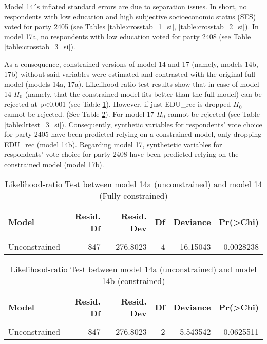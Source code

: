 \documentclass[
]{article}
\begin{document}
Model 14´s inflated standard errors are due to separation issues. In short, no respondents with
low education and high subjective socioeconomic status (SES) voted for party 2405 (see Tables \ref{table:crosstab_1_si},
\ref{table:crosstab_2_si}). In model 17a, no respondents with low education voted for party 2408
(see Table \ref{table:crosstab_3_si}).

As a consequence, constrained versions of model 14 and 17 (namely, models 14b, 17b) without said variables were
estimated and contrasted with the original full model (models 14a, 17a). Likelihood-ratio test results show
that in case of model 14 \(H_0\) (namely, that the constrained model fits better than the full model) can be rejected
at p\textless0.001 (see Table \ref{table:lrtest_1_si}). However, if just EDU\_rec is dropped \(H_0\) cannot be rejected.
(See Table \ref{table:lrtest_2_si}). For model 17 \(H_0\) cannot be rejected (see Table \ref{table:lrtest_3_si}).
Consequently, synthetic variables for respondents' vote choice for party 2405 have been
predicted relying on a constrained model, only dropping EDU\_rec (model 14b). Regarding model 17, synthetetic variables for respondents' vote choice for party 2408 have been predicted relying on the constrained model (model 17b).

\begin{table}[!h]

\caption{\label{tab:unnamed-chunk-164}Likelihood-ratio Test between model 14a (unconstrained) and model 14 (Fully constrained)
                  \label{table:lrtest_1_si}}
\centering
\begin{tabular}[t]{l|r|r|r|r|r}
\hline
Model & Resid. Df & Resid. Dev & Df & Deviance & Pr(>Chi)\\
\hline
\cellcolor{gray!6}{Constrained} & \cellcolor{gray!6}{851} & \cellcolor{gray!6}{292.9527} & \cellcolor{gray!6}{} & \cellcolor{gray!6}{} & \cellcolor{gray!6}{}\\
\hline
Unconstrained & 847 & 276.8023 & 4 & 16.15043 & 0.0028238\\
\hline
\end{tabular}
\end{table}

\begin{table}[!h]

\caption{\label{tab:unnamed-chunk-164}Likelihood-ratio Test between model 14a (unconstrained) and model 14b (constrained)
                  \label{table:lrtest_2_si}}
\centering
\begin{tabular}[t]{l|r|r|r|r|r}
\hline
Model & Resid. Df & Resid. Dev & Df & Deviance & Pr(>Chi)\\
\hline
\cellcolor{gray!6}{Constrained} & \cellcolor{gray!6}{849} & \cellcolor{gray!6}{282.3458} & \cellcolor{gray!6}{} & \cellcolor{gray!6}{} & \cellcolor{gray!6}{}\\
\hline
Unconstrained & 847 & 276.8023 & 2 & 5.543542 & 0.0625511\\
\hline
\end{tabular}
\end{table}
\end{document}

